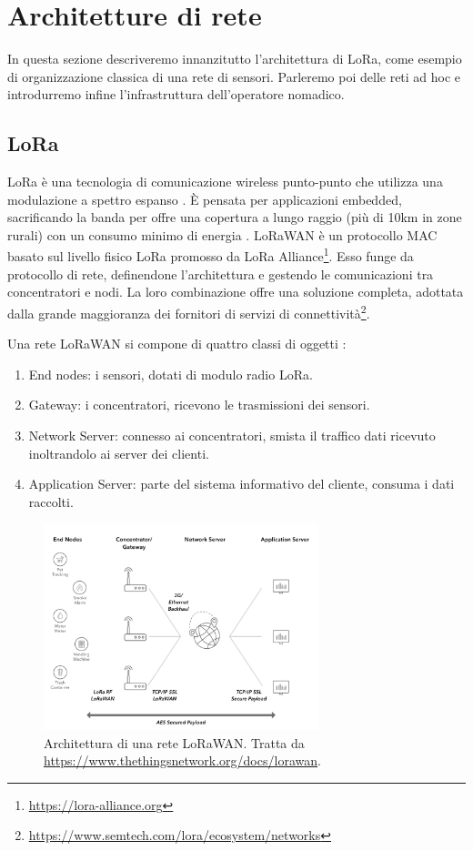 \documentclass[a4paper,11pt]{article}
\theoremstyle{definition}
\begin{document}
\section{Architetture di rete}

In questa sezione descriveremo innanzitutto l'architettura di LoRa, come esempio di organizzazione classica di una rete di sensori. Parleremo poi delle reti ad hoc e introdurremo infine l'infrastruttura dell'operatore nomadico.

\subsection{LoRa}

LoRa è una tecnologia di comunicazione wireless punto-punto che utilizza una modulazione a spettro espanso \cite{loramod}. È pensata per applicazioni embedded, sacrificando la banda per offre una copertura a lungo raggio (più di 10km in zone rurali) con un consumo minimo di energia \cite{loraperf}. LoRaWAN è un protocollo MAC basato sul livello fisico LoRa promosso da LoRa Alliance\footnote{\url{https://lora-alliance.org}}. Esso funge da protocollo di rete, definendone l'architettura e gestendo le comunicazioni tra concentratori e nodi. La loro combinazione offre una soluzione completa, adottata dalla grande maggioranza dei fornitori di servizi di connettività\footnote{\url{https://www.semtech.com/lora/ecosystem/networks}}.

Una rete LoRaWAN si compone di quattro classi di oggetti \cite{loraspec}:
\begin{enumerate}
\item End nodes: i sensori, dotati di modulo radio LoRa.
\item Gateway: i concentratori, ricevono le trasmissioni dei sensori.
\item Network Server: connesso ai concentratori, smista il traffico dati ricevuto inoltrandolo ai server dei clienti.
\item Application Server: parte del sistema informativo del cliente, consuma i dati raccolti.
\end{enumerate}

\begin{figure}[H]
\centering
\includegraphics[width=8cm]{figures/lorawan.png}
\caption{Architettura di una rete LoRaWAN. Tratta da \protect\url{https://www.thethingsnetwork.org/docs/lorawan}.}
\end{figure}
\end{document}
